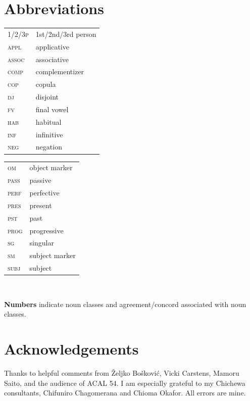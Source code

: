 \documentclass[output=paper,colorlinks,citecolor=brown
]{langscibook}
\begin{document}
\section*{Abbreviations}
\begin{tabularx}{.45\textwidth}{lQ}
  1/2/3\textsc{p} & 1st/2nd/3rd person\\
 \textsc{appl}&applicative\\
 \textsc{assoc} & associative\\
 \textsc{comp} & complementizer\\
 \textsc{cop} & copula\\
 \textsc{dj} & disjoint\\
 \textsc{fv} & final vowel\\
 \textsc{hab} & habitual\\
 \textsc{inf}& infinitive\\
 \textsc{neg} & negation\\
 \end{tabularx}
\begin{tabularx}{.45\textwidth}{lQ}
 \textsc{om} & object marker\\
 \textsc{pass} & passive\\
 \textsc{perf} & perfective\\
 \textsc{pres} & present\\
 \textsc{pst} & past\\
 \textsc{prog} & progressive\\
 \textsc{sg} & singular\\
 \textsc{sm} & subject marker\\
 \textsc{subj} & subject\\
\end{tabularx}\\\medskip


\noindent
 \textbf{Numbers} indicate noun classes and agreement/concord associated with noun classes.

\section*{Acknowledgements}
Thanks to helpful comments from Željko Bošković, Vicki Carstens, Mamoru Saito, and the audience of ACAL 54. I am especially grateful to my Chichewa consultants, Chifuniro Chagomerana and Chioma Okafor. All errors are mine.

\sloppy
\printbibliography[heading=subbibliography,notkeyword=this]
\end{document}
